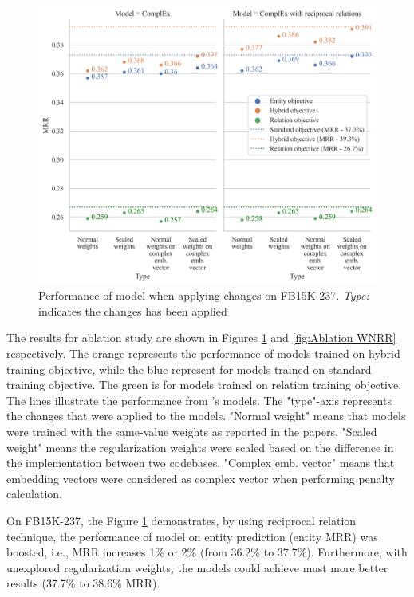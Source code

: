 \begin{figure}[!htbp]
	\begin{center}
	\includegraphics[width=\linewidth]{Images/Ablation_FB237.png}
	\caption[Performance of model when applying changes on FB15K-237]{Performance of model when applying changes on FB15K-237. \textit{Type:} indicates the changes has been applied}
	\label{fig:Ablation FB237}
	\end{center}
\end{figure}


The results for ablation study are shown in Figures \ref{fig:Ablation FB237} and \ref{fig:Ablation WNRR} respectively. The orange represents the performance of models trained on hybrid training objective, while the blue represent for models trained on standard training objective. The green is for models trained on relation training objective. The lines illustrate the performance from \citet{chen2021relation}'s models. The "type"-axis represents the changes that were applied to the models. "Normal weight" means that models were trained with the same-value weights as reported in the papers. "Scaled weight" means the regularization weights were scaled based on the difference in the implementation between two codebases. "Complex emb. vector" means that embedding vectors were considered as complex vector when performing penalty calculation.


On FB15K-237, the Figure \ref{fig:Ablation FB237} demonstrates, by using reciprocal relation technique, the performance of model on entity prediction (entity MRR) was boosted, i.e., MRR increases 1\% or 2\% (from 36.2\% to 37.7\%). Furthermore, with unexplored regularization weights, the models could achieve must more better results (37.7\% to 38.6\% MRR). 

